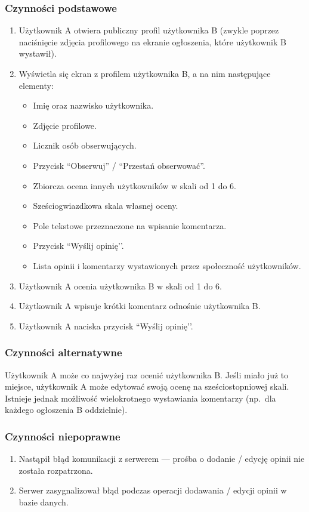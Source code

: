 \documentclass[licencjacka]{pracamgr}
\begin{document}
    \subsubsection{Czynności podstawowe}
    \begin{enumerate}
        \item Użytkownik A otwiera publiczny profil użytkownika B (zwykle poprzez naciśnięcie zdjęcia profilowego na ekranie ogłoszenia, które użytkownik B wystawił).
        \item Wyświetla się ekran z profilem użytkownika B, a na nim następujące elementy:
        \begin{itemize}
            \item Imię oraz nazwisko użytkownika.
            \item Zdjęcie profilowe.
            \item Licznik osób obserwujących.
            \item Przycisk ``Obserwuj'' / ``Przestań obserwować''.
            \item Zbiorcza ocena innych użytkowników w skali od 1 do 6.
            \item Sześciogwiazdkowa skala własnej oceny.
            \item Pole tekstowe przeznaczone na wpisanie komentarza.
            \item Przycisk ``Wyślij opinię’’.
            \item Lista opinii i komentarzy wystawionych przez społeczność użytkowników.
        \end{itemize}
        \item Użytkownik A ocenia użytkownika B w skali od 1 do 6.
        \item Użytkownik A wpisuje krótki komentarz odnośnie użytkownika B.
        \item Użytkownik A naciska przycisk ``Wyślij opinię’’.
    \end{enumerate}
    \subsubsection{Czynności alternatywne}
    Użytkownik A może co najwyżej raz ocenić użytkownika B. Jeśli miało już to miejsce, użytkownik A może edytować swoją ocenę na sześciostopniowej skali. Istnieje jednak możliwość wielokrotnego wystawiania komentarzy (np.\ dla każdego ogłoszenia B oddzielnie).
    \subsubsection{Czynności niepoprawne}
    \begin{enumerate}
        \item Nastąpił błąd komunikacji z serwerem --- prośba o dodanie / edycję opinii nie została rozpatrzona.
        \item Serwer zasygnalizował błąd podczas operacji dodawania / edycji opinii w bazie danych.
    \end{enumerate}
\end{document}
